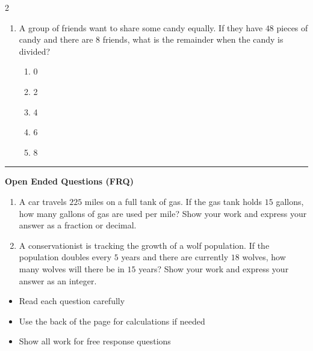 \documentclass[10pt]{article}
\begin{document}
\begin{multicols}{2}
\begin{enumerate}[label=\textbf{Q\arabic*.}, leftmargin=*, itemsep=6pt, parsep=0pt]
  \item \small A group of friends want to share some candy equally. If they have $48$ pieces of candy and there are $8$ friends, what is the remainder when the candy is divided?
  \begin{enumerate}[label=(\Alph*), leftmargin=0.6cm, nosep, itemsep=2pt]
    \item 0
    \item 2
    \item 4
    \item 6
    \item 8
  \end{enumerate}

\end{enumerate}
\end{multicols}

\vspace{-0.2cm}
\hrule
\vspace{0.2cm}
\textbf{\small Open Ended Questions (FRQ)}
\begin{enumerate}[label=\textbf{Q\arabic*.}, start=9, itemsep=5pt, topsep=0pt]

  \item \small A car travels $225$ miles on a full tank of gas. If the gas tank holds $15$ gallons, how many gallons of gas are used per mile? Show your work and express your answer as a fraction or decimal. \vspace{2cm}

  \item \small A conservationist is tracking the growth of a wolf population. If the population doubles every $5$ years and there are currently $18$ wolves, how many wolves will there be in $15$ years? Show your work and express your answer as an integer. \vspace{2cm}

\end{enumerate}

\vfill

\begin{tcolorbox}[colback=blue!5, colframe=mainblue!50, title=\small \textbf{Chef's Tips}, fonttitle=\bfseries, bottom=1mm]
\begin{itemize}[noitemsep, topsep=2pt, leftmargin=0.5cm]
  \item \scriptsize Read each question carefully\item \scriptsize Use the back of the page for calculations if needed\item \scriptsize Show all work for free response questions
\end{itemize}
\end{tcolorbox}
\end{document}
